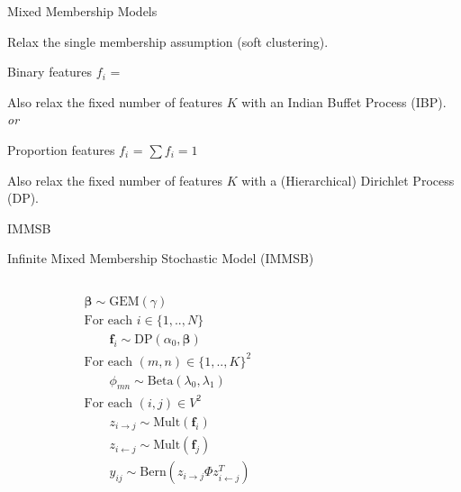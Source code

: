 \begin{frame}[c]{Mixed Membership Models}

    Relax the single membership assumption (soft clustering).

    \begin{block}{Binary features}
        $f_i$ = \raisebox{-2pt}{}
    \end{block}
    Also relax the fixed number of features $K$ with an Indian Buffet Process (IBP). \\

    \vspace{0.2cm}
    \emph{or}
    \vspace{0.2cm}

    \begin{block}{Proportion features}
        $f_i$ = \raisebox{-2pt}{} \hspace{2em} $\sum f_i=1$
    \end{block}
    Also relax the fixed number of features $K$ with a (Hierarchical) Dirichlet Process (DP). \\
    
\end{frame}

\begin{frame}[c]{IMMSB}

    Infinite Mixed Membership Stochastic Model (IMMSB) 
    \vspace{1cm}

    \begin{columns}[t]
        \begin{column}{0.5\textwidth}
            \vspace{-5cm}
            \begin{align*}
                &\bm{\beta} \sim \textrm{GEM}(\gamma)\\
                &\textrm{For each } i \in \{1, .., N\}  \\
                &\qquad\bm{f}_i \sim \textrm{DP}(\alpha_0, \bm{\beta})\\
                &\textrm{For each }  (m,n) \in \{1,..,K\}^2 \\
                &\qquad\phi_{mn} \sim \mathrm{Beta}(\lambda_0,\lambda_1)\\
                &\textrm{For each } (i,j) \in V^2 \\
                &\qquad z_{i \rightarrow j} \sim \mbox{Mult}(\bm{f}_i)\\
                &\qquad z_{i \leftarrow j} \sim \mbox{Mult}(\bm{f}_j)\\
                &\qquad y_{ij} \sim \mathrm{Bern}({z_{i \rightarrow j} \Phi z_{i \leftarrow j}^T})
            \end{align*}
        \end{column}
        \begin{column}{0.5\textwidth}
            \scalebox{0.88}{}
        \end{column}
    \end{columns}

\end{frame}

